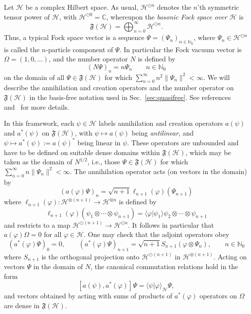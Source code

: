 \documentclass[12pt,a4paper]{article}
\newcommand{\1}{\mathds{1}}                         %
\newcommand{\NN}{\mathbb{N}}          %
\newcommand{\CC}{\mathbb{C}}           %
\newcommand{\FF}{{\mathfrak{F}}}
\newcommand{\HH}{{\mathcal{H}}}
\newcommand{\ip}[2]{\langle #1|#2\rangle}
\begin{document}
Let $\HH$ be a complex Hilbert space. As usual, $\HH^{\odot n}$ denotes the $n$'th symmetric tensor power of $\HH$, with $\HH^{\odot 0}=\CC$, whereupon the \emph{bosonic Fock space over $\HH$} is
\[
\FF(\HH) = \bigoplus_{n=0}^\infty \HH^{\odot n}.
\]
Thus, a typical Fock space vector is a sequence $\Psi = (\Psi_n)_{n\in\NN_0}$, where
$\Psi_n\in\HH^{\odot n}$ is called the $n$-particle component of $\Psi$. 
In particular the Fock vacuum vector is $\Omega=(1,0,\ldots)$, and the number operator
$N$ is defined by 
\[
(N\Psi)_n = n\Psi_n \qquad n\in\NN_0
\]
on the domain of all $\Psi\in\FF(\HH)$ for which $\sum_{n=0}^\infty n^2\|\Psi_n\|^2<\infty$.
We will describe the annihilation and creation operators and the number operator on $\FF(\HH)$ in the basis-free notation used in Sec.~\ref{sec:quasifree}. 
See references~\cite[\S 5.2.1]{BratRob:vol2} and~\cite[\S X.7]{ReedSimon:vol2} for more details.

In this framework, each $\psi\in\HH$ labels annihilation and creation operators $a(\psi)$ and $a^*(\psi)$ on $\FF(\HH)$, with $\psi\mapsto a(\psi)$ being \emph{antilinear}, and $\psi\mapsto a^*(\psi):=a(\psi)^*$ being linear in $\psi$. These operators are unbounded and have to be defined on suitable dense domains within $\FF(\HH)$, which may be taken as the domain of $N^{1/2}$, i.e., those $\Psi\in\FF(\HH)$ for which $\sum_{n=0}^\infty n\|\Psi_n\|^2<\infty$. The annihilation operator acts (on vectors in the domain) by
\[
(a(\varphi)\Psi)_n = \sqrt{n+1} \ell_{n+1}(\varphi)(\Psi_{n+1})
\]
where $\ell_{n+1}(\varphi):\HH^{\otimes (n+1)}\to\HH^{\otimes n}$ is defined by 
\[
\ell_{n+1}(\varphi)(\psi_1\otimes\cdots\otimes\psi_{n+1}) = \ip{\varphi}{\psi_1}\psi_2\otimes\cdots\otimes \psi_{n+1}
\]
and restricts to a map $\HH^{\odot (n+1)}\to\HH^{\odot n}$. It follows in particular that $a(\varphi)\Omega=0$ for all $\varphi\in\HH$. One may check that the adjoint operators obey
\[
(a^*(\varphi)\Psi)_0=0,\qquad
(a^*(\varphi)\Psi)_{n+1} = \sqrt{n+1} S_{n+1} (\varphi\otimes\Psi_{n}),\qquad n\in\NN_0
\]
where $S_{n+1}$ is the orthogonal projection onto $\HH^{\odot (n+1)}$ in $\HH^{\otimes (n+1)}$. 
Acting on vectors $\Psi$ in the domain of $N$, the canonical commutation relations hold in the form
\begin{equation}\label{eq:CCRsappx}
[a(\psi),a^*(\varphi)]\Psi = \ip{\psi}{\varphi}_\HH \Psi,
\end{equation}
and vectors obtained by acting with sums of products of $a^*(\varphi)$ operators on $\Omega$ are dense in $\FF(\HH)$.
\end{document}
